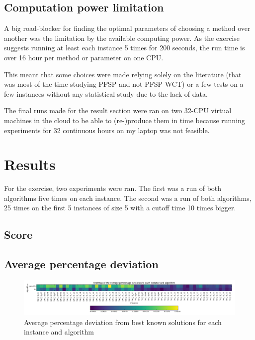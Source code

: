 \documentclass[a4paper]{article}
\begin{document}
\subsection{Computation power limitation}
\label{power}

A big road-blocker for finding the optimal parameters of choosing a method over another was the limitation by the available computing power. As the exercise suggests running at least each instance 5 times for 200 seconds, the run time is over 16 hour per method or parameter on one CPU.

This meant that some choices were made relying solely on the literature (that was most of the time studying PFSP and not PFSP-WCT) or a few tests on a few instances without any statistical study due to the lack of data.

The final runs made for the result section were ran on two 32-CPU virtual machines in the cloud to be able to (re-)produce them in time because running experiments for 32 continuous hours on my laptop was not feasible.

\section{Results}

For the exercise, two experiments were ran. The first was a run of both algorithms five times on each instance.
The second was a run of both algorithms, 25 times on the first 5 instances of size 5 with a cutoff time 10 times bigger.


\subsection{Score}

\subsection{Average percentage deviation}

        \begin{figure}[H]
            \centering
            \label{dev_algo_instance}
            \includegraphics[width=1.1\textwidth]{heatmap.png}
            \caption{Average percentage deviation from best known solutions for each instance and algorithm}
        \end{figure}
\end{document}
